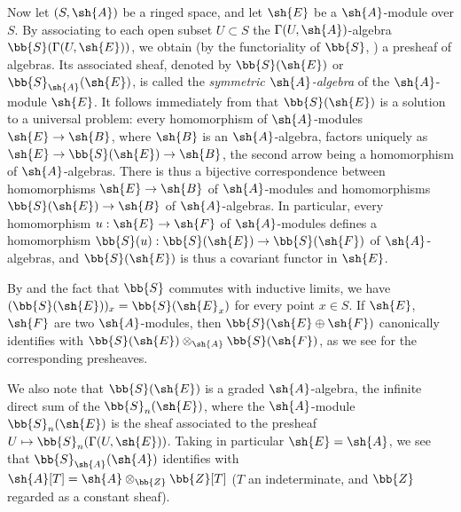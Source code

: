 \begin{env}[1.7.4]
\label{II.1.7.4}
Now let $(S,\sh{A})$ be a ringed space, and let $\sh{E}$ be a $\sh{A}$-module over $S$.
By associating to each open subset $U\subset S$ the $\Gamma(U,\sh{A})$-algebra $\bb{S}(\Gamma(U,\sh{E}))$, we obtain (by the functoriality of $\bb{S}$, ) a presheaf of algebras. Its associated sheaf, denoted by $\bb{S}(\sh{E})$ or $\bb{S}_\sh{A}(\sh{E})$, is called the \emph{symmetric $\sh{A}$-algebra} of the $\sh{A}$-module $\sh{E}$.
It follows immediately from  that $\bb{S}(\sh{E})$ is a solution to a universal problem: every homomorphism of $\sh{A}$-modules $\sh{E}\to\sh{B}$, where $\sh{B}$ is an $\sh{A}$-algebra, factors uniquely as $\sh{E}\to\bb{S}(\sh{E})\to\sh{B}$, the second arrow being a homomorphism of $\sh{A}$-algebras.
There is thus a bijective correspondence between homomorphisms $\sh{E}\to\sh{B}$ of $\sh{A}$-modules and homomorphisms $\bb{S}(\sh{E})\to\sh{B}$ of $\sh{A}$-algebras.
In particular, every homomorphism $u:\sh{E}\to\sh{F}$ of $\sh{A}$-modules defines a homomorphism $\bb{S}(u):\bb{S}(\sh{E})\to\bb{S}(\sh{F})$ of $\sh{A}$-algebras, and $\bb{S}(\sh{E})$ is thus a covariant functor in $\sh{E}$.

By  and the fact that $\bb{S}$ commutes with inductive limits, we have $(\bb{S}(\sh{E}))_x=\bb{S}(\sh{E}_x)$ for every point $x\in S$.
If $\sh{E}$, $\sh{F}$ are two $\sh{A}$-modules, then $\bb{S}(\sh{E}\oplus\sh{F})$ canonically identifies with $\bb{S}(\sh{E})\otimes_\sh{A}\bb{S}(\sh{F})$, as we see for the corresponding presheaves.

We also note that $\bb{S}(\sh{E})$ is a graded $\sh{A}$-algebra, the infinite direct sum of the $\bb{S}_n(\sh{E})$, where the $\sh{A}$-module $\bb{S}_n(\sh{E})$ is the sheaf associated to the presheaf $U\mapsto\bb{S}_n(\Gamma(U,\sh{E}))$.
Taking in particular $\sh{E}=\sh{A}$, we see that $\bb{S}_\sh{A}(\sh{A})$ identifies with $\sh{A}[T]=\sh{A}\otimes_\bb{Z}\bb{Z}[T]$ ($T$ an indeterminate, and $\bb{Z}$ regarded as a constant sheaf).
\end{env}

